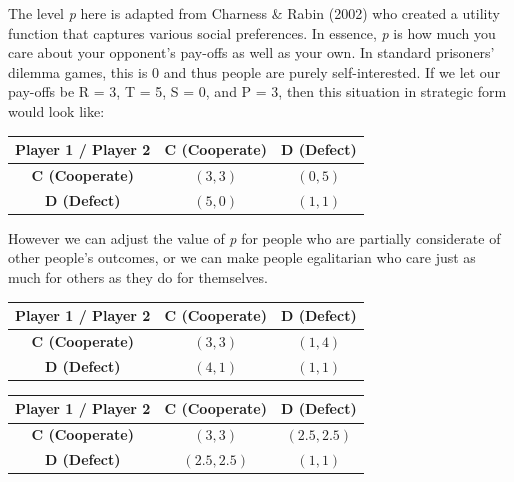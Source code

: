 \documentclass[11pt,preprint]{elsarticle}
\let\origtable\table
\let\endorigtable\endtable
\renewenvironment{table}[1][2] {
    \expandafter\origtable\expandafter[H]
} {
    \endorigtable
}
\numberwithin{equation}{section}
\numberwithin{figure}{section}
\numberwithin{table}{section}
\begin{document}
The level \emph{p} here is adapted from Charness \& Rabin (2002) who
created a utility function that captures various social preferences. In
essence, \emph{p} is how much you care about your opponent's pay-offs as
well as your own. In standard prisoners' dilemma games, this is 0 and
thus people are purely self-interested. If we let our pay-offs be R = 3,
T = 5, S = 0, and P = 3, then this situation in strategic form would
look like:

\begin{table}[ht]
\centering
\begin{tabular}{|c|c|c|}
\hline
\textbf{Player 1 / Player 2} & \textbf{C (Cooperate)} & \textbf{D (Defect)} \\
\hline
\textbf{C (Cooperate)} & $(3, 3)$ & $(0, 5)$ \\
\hline
\textbf{D (Defect)} & $(5, 0)$ & $(1, 1)$ \\
\hline
\end{tabular}
\caption{Prisoner's Dilemma Payoff Matrix for $p = 0$ (Self-interested person)}
\end{table}

However we can adjust the value of \emph{p} for people who are partially
considerate of other people's outcomes, or we can make people
egalitarian who care just as much for others as they do for themselves.

\begin{table}[ht]
\centering
\begin{tabular}{|c|c|c|}
\hline
\textbf{Player 1 / Player 2} & \textbf{C (Cooperate)} & \textbf{D (Defect)} \\
\hline
\textbf{C (Cooperate)} & $(3, 3)$ & $(1, 4)$ \\
\hline
\textbf{D (Defect)} & $(4, 1)$ & $(1, 1)$ \\
\hline
\end{tabular}
\caption{Prisoner's Dilemma Payoff Matrix for $p = 0.2$ (Partially considers others' outcomes)}
\end{table}

\begin{table}[ht]
\centering
\begin{tabular}{|c|c|c|}
\hline
\textbf{Player 1 / Player 2} & \textbf{C (Cooperate)} & \textbf{D (Defect)} \\
\hline
\textbf{C (Cooperate)} & $(3, 3)$ & $(2.5, 2.5)$ \\
\hline
\textbf{D (Defect)} & $(2.5, 2.5)$ & $(1, 1)$ \\
\hline
\end{tabular}
\caption{Prisoner's Dilemma Payoff Matrix for $p = 0.5$ (Egalitarian person)}
\end{table}
\end{document}
